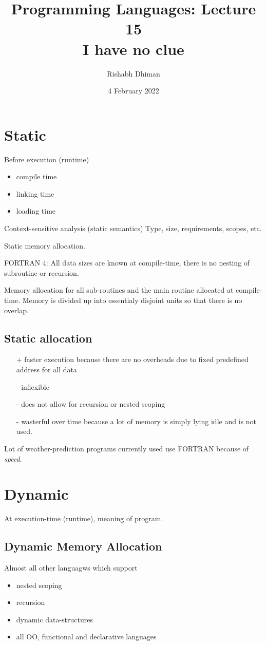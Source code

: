 \documentclass[a4paper]{scrartcl}
\title{
	Programming Languages: Lecture 15\\
	I have no clue
}
\author{Rishabh Dhiman}
\date{4 February 2022}
\theoremstyle{definition}
\begin{document}
\maketitle

\section{Static}

Before execution (runtime)
\begin{itemize}
	\item compile time
	\item linking time
	\item loading time
\end{itemize}

Context-sensitive analysis (static semantics)
Type, size, requirements, scopes, etc.

Static memory allocation.

FORTRAN 4:
All data sizes are known at compile-time, there is no nesting of subroutine or recursion.

Memory allocation for all sub-routines and the main routine allocated at compile-time. Memory is divided up into essentialy disjoint units so that there is no overlap.

\subsection{Static allocation}
\begin{itemize}
	\item[+] faster execution because there are no overheads due to fixed predefined address for all data
	\item[-] inflexible
	\item[-] does not allow for recursion or nested scoping
	\item[-] wasterful over time because a lot of memory is simply lying idle and is not used.
\end{itemize}
Lot of weather-prediction programs currently used use FORTRAN because of \textit{speed}.

\section{Dynamic}

At execution-time (runtime), meaning of program.

\subsection{Dynamic Memory Allocation}
Almost all other languagws which support
\begin{itemize}
	\item nested scoping
	\item recursion
	\item dynamic data-structures
	\item all OO, functional and declarative languages
\end{itemize}
\end{document}
